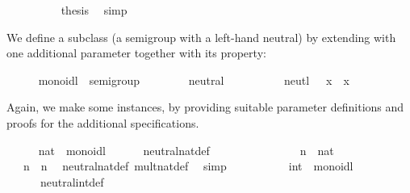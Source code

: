 \begin{isabellebody}
\isanewline
\ \ \ \ \ \ \ \ \isamarkupfalse%
\ {\isacharquery}thesis\ \isamarkupfalse%
\ simp\isanewline
\ \ \ \ \ \ \isamarkupfalse%
\isanewline
\ \ \ \ \isamarkupfalse%
%
\endisatagproof
{\isafoldproof}%
%
\isadelimproof
%
\endisadelimproof
%
\isamarkuptrue%
%
\begin{isamarkuptext}%
We define a subclass  (a semigroup with a left-hand neutral)
  by extending 
  with one additional parameter  together
  with its property:%
\end{isamarkuptext}%
\isamarkuptrue%
\ \ \ \ \isamarkupfalse%
\ monoidl\ {\isacharequal}\ semigroup\ {\isacharplus}\isanewline
\ \ \ \ \ \ \ neutral\ {\isacharcolon}{\isacharcolon}\ {\isachardoublequoteopen}{\isasymalpha}{\isachardoublequoteclose}\ {\isacharparenleft}{\isachardoublequoteopen}{\isasymone}{\isachardoublequoteclose}{\isacharparenright}\isanewline
\ \ \ \ \ \ \ neutl{\isacharcolon}\ {\isachardoublequoteopen}{\isasymone}\ {\isasymotimes}\ x\ {\isacharequal}\ x{\isachardoublequoteclose}%
\begin{isamarkuptext}%
\noindent Again, we make some instances, by
  providing suitable parameter definitions and proofs for the
  additional specifications.%
\end{isamarkuptext}%
\isamarkuptrue%
\ \ \ \ \isamarkupfalse%
\ nat\ {\isacharcolon}{\isacharcolon}\ monoidl\isanewline
\ \ \ \ \ \ neutral{\isacharunderscore}nat{\isacharunderscore}def{\isacharcolon}\ {\isachardoublequoteopen}{\isasymone}\ {\isasymequiv}\ {}{\isachardoublequoteclose}\isanewline
%
\isadelimproof
\ \ \ \ %
\endisadelimproof
%
\isatagproof
{}\isamarkupfalse%
\isanewline
\ \ \ \ \ \ \isamarkupfalse%
\ n\ {\isacharcolon}{\isacharcolon}\ nat\isanewline
\ \ \ \ \ \ \isamarkupfalse%
\ {\isachardoublequoteopen}{\isasymone}\ {\isasymotimes}\ n\ {\isacharequal}\ n{\isachardoublequoteclose}\ \isamarkupfalse%
\ neutral{\isacharunderscore}nat{\isacharunderscore}def\ mult{\isacharunderscore}nat{\isacharunderscore}def\ \isamarkupfalse%
\ simp\isanewline
\ \ \ \ \isamarkupfalse%
%
\endisatagproof
{\isafoldproof}%
%
\isadelimproof
\isanewline
%
\endisadelimproof
\isanewline
\ \ \ \ \isamarkupfalse%
\ int\ {\isacharcolon}{\isacharcolon}\ monoidl\isanewline
\ \ \ \ \ \ neutral{\isacharunderscore}int{\isacharunderscore}def{\isacharcolon}\ {\isachardoublequoteopen}{\isasymone}\ {\isasymequiv}\ {}{\isachardoublequoteclose}\isanewline

\end{isabellebody}
